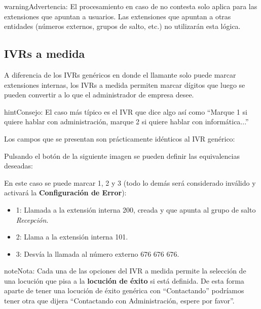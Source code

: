 \documentclass[letterpaper,10pt,spanish]{sphinxmanual}
\begin{document}
\begin{notice}{warning}{Advertencia:}
El procesamiento en caso de no contesta solo aplica para las extensiones que apuntan a usuarios. Las extensiones que apuntan a otras entidades (números externos, grupos de salto, etc.) no utilizarán esta lógica.
\end{notice}


\subsection{IVRs a medida}
\label{pbx_features/ivrs:id2}\label{pbx_features/ivrs:custom-ivrs}
A diferencia de los IVRs genéricos en donde el llamante solo puede marcar extensiones internas, los IVRs a medida permiten marcar dígitos que luego se pueden convertir a lo que el administrador de empresa desee.

\begin{notice}{hint}{Consejo:}
El caso más típico es el IVR que dice algo así como ``Marque 1 si quiere hablar con administración, marque 2 si quiere hablar con informática...''
\end{notice}

Los campos que se presentan son prácticamente idénticos al IVR genérico:

Pulsando el botón de la siguiente imagen se pueden definir las equivalencias deseadas:

\noindent{}

En este caso se puede marcar 1, 2 y 3 (todo lo demás será considerado inválido y activará la \textbf{Configuración de Error}):

\noindent{}
\begin{itemize}
\item {} 
1: Llamada a la extensión interna 200, creada {\hyperref[pbx_features/huntgroups:huntgroups]{}} y que apunta al grupo de salto \emph{Recepción}.

\item {} 
2: Llama a la extensión interna 101.

\item {} 
3: Desvía la llamada al número externo 676 676 676.

\end{itemize}

\begin{notice}{note}{Nota:}
Cada una de las opciones del IVR a medida permite la selección de una locución que pisa a la \textbf{locución de éxito} si está definida. De esta forma aparte de tener una locución de éxito genérica con ``Contactando'' podríamos tener otra que dijera ``Contactando con Administración, espere por favor''.
\end{notice}
\end{document}
